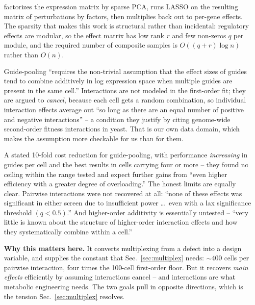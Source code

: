  factorizes the expression matrix by sparse
PCA, runs LASSO on the resulting matrix of perturbations by factors, then multiplies
back out to per-gene effects. The sparsity that makes this work is structural
rather than incidental: regulatory effects are modular, so the effect matrix has
low rank $r$ and few non-zeros $q$ per module, and the required number of composite
samples is $O\!\left((q+r)\log n\right)$ rather than $O(n)$.

 Guide-pooling ``requires the non-trivial
assumption that the effect sizes of guides tend to combine additively in log
expression space when multiple guides are present in the same cell.'' Interactions
are not modeled in the first-order fit; they are argued to \emph{cancel}, because
each cell gets a random combination, so individual interaction effects average out
``so long as there are an equal number of positive and negative interactions'' -- a condition they justify by citing genome-wide second-order fitness interactions in
yeast. That is our own data domain, which makes the assumption more checkable for
us than for them.

 A stated 10-fold cost reduction
for guide-pooling, with performance \emph{increasing} in guides per cell and the
best results in cells carrying four or more -- they found no ceiling within the
range tested and expect further gains from ``even higher efficiency with a greater
degree of overloading.'' The honest limits are equally clear. Pairwise interactions
were not recovered at all: ``none of these effects was significant in either screen
due to insufficient power \dots\ even with a lax significance threshold
$(q<0.5)$.'' And higher-order additivity is essentially untested -- ``very little
is known about the structure of higher-order interaction effects and how they
systematically combine within a cell.''

\begin{keybox}
\textbf{Why this matters here.} It converts multiplexing from a defect into a
design variable, and supplies the constant that Sec.~\ref{sec:multiplex} needs:
$\sim$400 cells per pairwise interaction, four times the 100-cell first-order
floor. But it recovers \emph{main effects} efficiently by assuming interactions
cancel -- and interactions are what metabolic engineering needs. The two goals
pull in opposite directions, which is the tension Sec.~\ref{sec:multiplex}
resolves.
\end{keybox}

